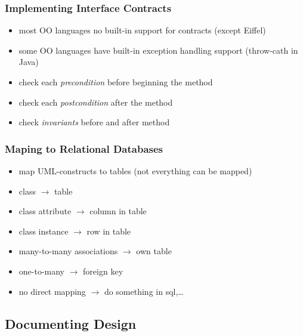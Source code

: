 \documentclass[a4paper, 10pt]{article}
\begin{document}
\subsubsection*{Implementing Interface Contracts}
\begin{itemize}
	\item most OO languages no built-in support for contracts (except Eiffel)
	\item some OO languages have built-in exception handling support (throw-cath in Java)
	\item check each \emph{precondition} before beginning the method
	\item check each \emph{postcondition} after the method
	\item check \emph{invariants} before and after method
\end{itemize}

\subsubsection*{Maping to Relational Databases}
\begin{itemize}
	\item map UML-constructs to tables (not everything can be mapped)
	\item class $\to$ table
	\item class attribute $\to$ column in table
	\item class instance $\to$ row in table
	\item many-to-many associations $\to$ own table
	\item one-to-many $\to$ foreign key
	\item no direct mapping $\to$ do something in sql,\dots
\end{itemize}

\subsection*{Documenting Design}
\end{document}
